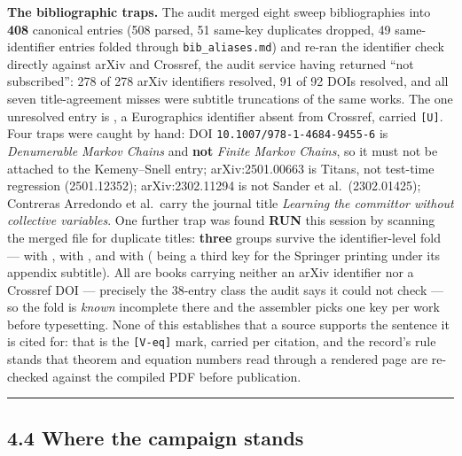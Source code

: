 \documentclass[11pt,a4paper]{article}
\theoremstyle{plain}
\theoremstyle{definition}
\theoremstyle{remark}
\begin{document}
\textbf{The bibliographic traps.} The audit merged eight sweep
bibliographies into \textbf{408} canonical entries (508 parsed, 51
same-key duplicates dropped, 49 same-identifier entries folded through
\texttt{bib\_aliases.md}) and re-ran the identifier check directly
against arXiv and Crossref, the audit service having returned ``not
subscribed'': 278 of 278 arXiv identifiers resolved, 91 of 92 DOIs
resolved, and all seven title-agreement misses were subtitle truncations
of the same works. The one unresolved entry is
\citep{singh-2007-mapper}, a Eurographics identifier absent from
Crossref, carried \texttt{{[}U{]}}. Four traps were caught by hand: DOI
\texttt{10.1007/978-1-4684-9455-6} is \emph{Denumerable Markov Chains}
and \textbf{not} \emph{Finite Markov Chains}, so it must not be attached
to the Kemeny--Snell entry; arXiv:2501.00663 is Titans, not test-time
regression (2501.12352); arXiv:2302.11294 is not Sander et
al.~(2302.01425); Contreras Arredondo et al.~carry the journal title
\emph{Learning the committor without collective variables}. One further
trap was found \textbf{RUN} this session by scanning the merged file for
duplicate titles: \textbf{three} groups survive the identifier-level
fold --- \citep{altman-1999-cmdp} with \citep{altman-1999-constrained},
\citep{basseville-1993-abrupt-changes} with
\citep{basseville-1993-detection}, and \citep{kemeny-1960-finitemarkov}
with \citep{kemeny-1976-finitemarkov} (\citep{kemeny-1976-finite} being
a third key for the Springer printing under its appendix subtitle). All
are books carrying neither an arXiv identifier nor a Crossref DOI ---
precisely the 38-entry class the audit says it could not check --- so
the fold is \emph{known} incomplete there and the assembler picks one
key per work before typesetting. None of this establishes that a source
supports the sentence it is cited for: that is the \texttt{{[}V-eq{]}}
mark, carried per citation, and the record's rule stands that theorem
and equation numbers read through a rendered page are re-checked against
the compiled PDF before publication.

\begin{center}\rule{0.5\linewidth}{0.5pt}\end{center}

\subsection{4.4 Where the campaign
stands}\label{where-the-campaign-stands}
\end{document}
